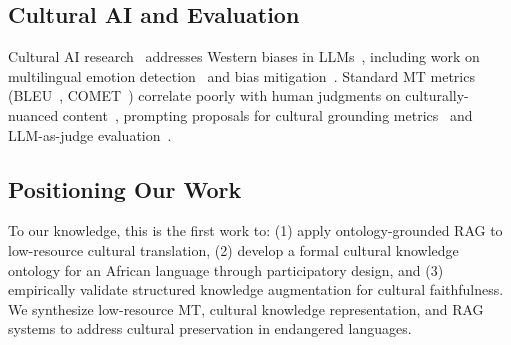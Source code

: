 \subsection{Cultural AI and Evaluation}
\label{subsec:cultural_ai}

Cultural AI research~\cite{hershcovich2022challenges} addresses Western biases in LLMs~\cite{blodgett2020language}, including work on multilingual emotion detection~\cite{plaza2011cross} and bias mitigation~\cite{dev2021measures}. Standard MT metrics (BLEU~\cite{papineni2002bleu}, COMET~\cite{rei2020comet}) correlate poorly with human judgments on culturally-nuanced content~\cite{mathur2020tangled}, prompting proposals for cultural grounding metrics~\cite{wan2024culturellm} and LLM-as-judge evaluation~\cite{dubois2024lengthcontrolled}.

\subsection{Positioning Our Work}
\label{subsec:positioning}

To our knowledge, this is the first work to: (1) apply ontology-grounded RAG to low-resource cultural translation, (2) develop a formal cultural knowledge ontology for an African language through participatory design, and (3) empirically validate structured knowledge augmentation for cultural faithfulness. We synthesize low-resource MT, cultural knowledge representation, and RAG systems to address cultural preservation in endangered languages.
